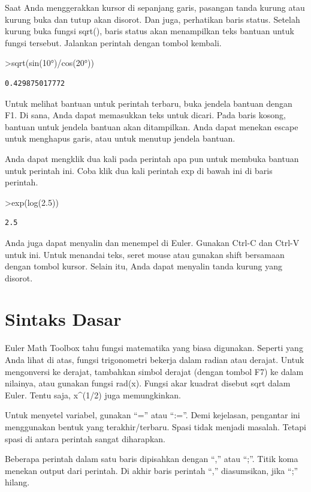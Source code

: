 \documentclass[
]{book}
\begin{document}
Saat Anda menggerakkan kursor di sepanjang garis, pasangan tanda kurung atau kurung buka dan tutup akan disorot. Dan juga, perhatikan baris status. Setelah kurung buka fungsi sqrt(), baris status akan menampilkan teks bantuan untuk fungsi tersebut. Jalankan perintah dengan tombol kembali.

\textgreater sqrt(sin(10°)/cos(20°))

\begin{verbatim}
0.429875017772
\end{verbatim}

Untuk melihat bantuan untuk perintah terbaru, buka jendela bantuan dengan F1. Di sana, Anda dapat memasukkan teks untuk dicari. Pada baris kosong, bantuan untuk jendela bantuan akan ditampilkan. Anda dapat menekan escape untuk menghapus garis, atau untuk menutup jendela bantuan.

Anda dapat mengklik dua kali pada perintah apa pun untuk membuka bantuan untuk perintah ini. Coba klik dua kali perintah exp di bawah ini di baris perintah.

\textgreater exp(log(2.5))

\begin{verbatim}
2.5
\end{verbatim}

Anda juga dapat menyalin dan menempel di Euler. Gunakan Ctrl-C dan Ctrl-V untuk ini. Untuk menandai teks, seret mouse atau gunakan shift bersamaan dengan tombol kursor. Selain itu, Anda dapat menyalin tanda kurung yang disorot.

\section{Sintaks Dasar}\label{sintaks-dasar}

Euler Math Toolbox tahu fungsi matematika yang biasa digunakan. Seperti yang Anda lihat di atas, fungsi trigonometri bekerja dalam radian atau derajat. Untuk mengonversi ke derajat, tambahkan simbol derajat (dengan tombol F7) ke dalam nilainya, atau gunakan fungsi rad(x). Fungsi akar kuadrat disebut sqrt dalam Euler. Tentu saja, x\^{}(1/2) juga memungkinkan.

Untuk menyetel variabel, gunakan ``='' atau ``:=''. Demi kejelasan, pengantar ini menggunakan bentuk yang terakhir/terbaru. Spasi tidak menjadi masalah. Tetapi spasi di antara perintah sangat diharapkan.

Beberapa perintah dalam satu baris dipisahkan dengan ``,'' atau ``;''. Titik koma menekan output dari perintah. Di akhir baris perintah ``,'' diasumsikan, jika ``;'' hilang.
\end{document}

